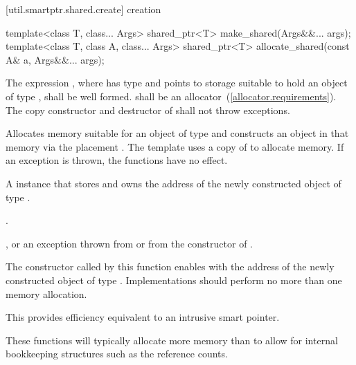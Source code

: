 [util.smartptr.shared.create]{ creation}

%
%
\begin{itemdecl}
template<class T, class... Args>
  shared_ptr<T> make_shared(Args&&... args);
template<class T, class A, class... Args>
  shared_ptr<T> allocate_shared(const A& a, Args&&... args);
\end{itemdecl}

\begin{itemdescr}
\pnum
\requires The expression ,
where  has type  and points to storage suitable
to hold an object of type , shall be well formed.  shall
be an allocator~(\ref{allocator.requirements}). The copy constructor
and destructor of  shall not throw exceptions.

\pnum
\effects Allocates memory suitable for an object of type 
and constructs an object in that memory via the placement
.
The template  uses a copy of  to
allocate memory. If an exception is thrown, the functions have no effect.

\pnum
\returns A  instance that stores and owns
the address of the newly constructed object of type .

\pnum
\postconditions {}.

\pnum
\throws {}, or an exception thrown from
 or from the constructor of .

\pnum
\remarks The  constructor called by this function
enables  with the address
of the newly constructed object of type .
Implementations should
perform no more than one memory allocation. \begin{note} This provides
efficiency equivalent to an intrusive smart pointer. \end{note}

\pnum
\begin{note} These functions will typically allocate more memory
than  to allow for internal bookkeeping structures such
as the reference counts. \end{note}
\end{itemdescr}

